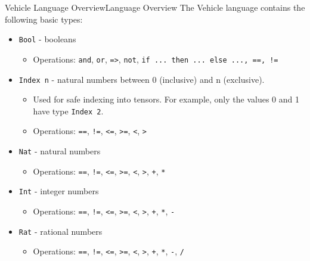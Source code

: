 \documentclass[t,compress,aspectratio=169]{beamer}
\newcommand{\vehicle}[1]{{\texttt{#1}}}
\begin{document}
\begin{frame}{Vehicle Language Overview}{Language Overview}
The Vehicle language contains the following basic types:
\begin{itemize}
\item \vehicle{Bool} - booleans
\begin{itemize}
\item Operations: \vehicle{and}, \vehicle{or}, \vehicle{=>}, \vehicle{not}, \vehicle{if ... then ... else ..., ==, !=}
\end{itemize} 
\item \vehicle{Index n} - natural numbers between 0 (inclusive) and n (exclusive).
\begin{itemize}
\item Used for safe indexing into tensors. For example, only the values 0 and 1 have type \vehicle{Index 2}.
\item Operations: \vehicle{==}, \vehicle{!=}, \vehicle{<=}, \vehicle{>=}, \vehicle{<}, \vehicle{>}
\end{itemize} 
\item \vehicle{Nat} - natural numbers
\begin{itemize}
\item Operations: \vehicle{==}, \vehicle{!=}, \vehicle{<=}, \vehicle{>=}, \vehicle{<}, \vehicle{>}, \vehicle{+}, \vehicle{*}
\end{itemize} 
\item \vehicle{Int} - integer numbers
\begin{itemize}
\item Operations: \vehicle{==}, \vehicle{!=}, \vehicle{<=}, \vehicle{>=}, \vehicle{<}, \vehicle{>}, \vehicle{+}, \vehicle{*}, \vehicle{-}
\end{itemize} 
\item \vehicle{Rat} - rational numbers
\begin{itemize}
\item Operations: \vehicle{==}, \vehicle{!=}, \vehicle{<=}, \vehicle{>=}, \vehicle{<}, \vehicle{>}, \vehicle{+}, \vehicle{*}, \vehicle{-}, \vehicle{/}
\end{itemize} 
\end{itemize}

\end{frame}
\end{document}
